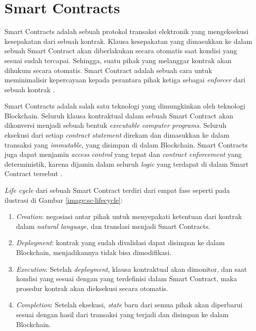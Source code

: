 \section{Smart Contracts}
\label{sec:smart-contract}

Smart Contracts adalah sebuah protokol transaksi elektronik yang mengeksekusi kesepakatan dari sebuah kontrak. Klausa kesepakatan yang dimasukkan ke dalam sebuah Smart Contract akan diberlakukan secara otomatis saat kondisi yang sesuai sudah tercapai. Sehingga, suatu pihak yang melanggar kontrak akan dihukum secara otomatis. Smart Contract adalah sebuah cara untuk meminimalisir kepercayaan kepada perantara pihak ketiga sebagai \textit{enforcer} dari sebuah kontrak \parencite{szabo1997formalizing}.

Smart Contracts adalah salah satu teknologi yang dimungkinkan oleh teknologi Blockchain. Seluruh klausa kontraktual dalam sebuah Smart Contract akan dikonversi menjadi sebuah bentuk \textit{executable computer programs}. Seluruh eksekusi dari setiap \textit{contract statement} direkam dan dimasukkan ke dalam transaksi yang \textit{immutable}, yang disimpan di dalam Blockchain. Smart Contracts juga dapat menjamin \textit{access control} yang tepat dan \textit{contract enforcement} yang deterministik, karena dijamin dalam seluruh \textit{logic} yang terdapat di dalam Smart Contract tersebut \parencite{zheng2020overview}.

\textit{Life cycle} dari sebuah Smart Contract terdiri dari empat fase seperti pada ilustrasi di Gambar \ref{image:sc-lifecycle}:

\begin{enumerate}
	\item \textit{Creation}: negosiasi antar pihak untuk menyepakati ketentuan dari kontrak dalam \textit{natural language}, dan translasi menjadi Smart Contracts.
	\item \textit{Deployment}: kontrak yang sudah divalidasi dapat disimpan ke dalam Blockchain, menjadikannya tidak bisa dimodifikasi.
	\item \textit{Execution}: Setelah \textit{deployment}, klausa kontraktual akan dimonitor, dan saat kondisi yang sesuai dengan yang terdefinisi dalam Smart Contract, maka prosedur kontrak akan dieksekusi secara otomatis.
	\item \textit{Completion}: Setelah eksekusi, \textit{state} baru dari semua pihak akan diperbarui sesuai dengan hasil dari transaksi yang terjadi dan disimpan ke dalam Blockchain. 
\end{enumerate}

